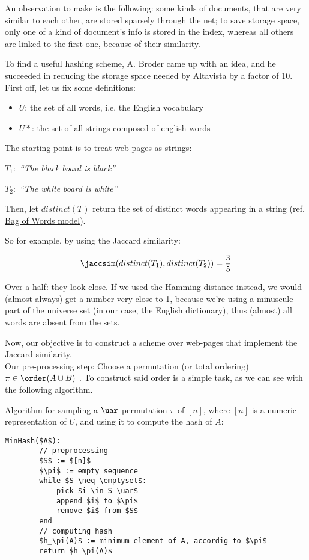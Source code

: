 	An observation to make is the following: some kinds of documents, that are very similar to each other, are stored sparsely through the net; to save storage space, only one of a kind of document's info is stored in the index, whereas all others are linked to the first one, because of their similarity.
	
	To find a useful hashing scheme, A. Broder came up with an idea, and he succeeded in reducing the storage space needed by Altavista by a factor of 10.\\
	First off, let us fix some definitions:
	\begin{itemize}
	\item $U$: the set of all words, i.e. the English vocabulary
	\item $U*$: the set of all strings composed of english words
	\end{itemize}
	
	The starting point is to treat web pages as strings:
	
	$T_1:$ \textit{``The black board is black''}
	
	$T_2:$ \textit{``The white board is white''}
	
	Then, let $distinct(T)$ return the set of distinct words appearing in a string (ref. \href{https://en.wikipedia.org/wiki/Bag-of-words_model}{Bag of Words model}).
	
	So for example, by using the Jaccard similarity:
    
    \begin{equation}
    \jaccsim(distinct(T_1), distinct(T_2))= \frac{3}{5}
    \end{equation}
	
	Over a half: they look close. If we used the Hamming distance instead, we would (almost always) get a number very close to 1, because we're using a minuscule part of the universe set (in our case, the English dictionary), thus (almost) all words are absent from the sets.
	
	Now, our objective is to construct a scheme over web-pages that implement the Jaccard similarity.\\
	Our pre-processing step: Choose a permutation (or total ordering) $\pi \in \order(A \cup B)$ \uar. To construct said order is a simple task, as we can see with the following algorithm.
	
	\newpage
	Algorithm for sampling a $\uar$ permutation $\pi$ of $[n]$, where $[n]$ is a numeric representation of $U$, and using it to compute the hash of $A$:
	\begin{lstlisting}[caption={min hash or shingles algorithm},label={lst:min_hash}]
	MinHash($A$):
	    // preprocessing
	    $S$ := $[n]$
	    $\pi$ := empty sequence
	    while $S \neq \emptyset$:
	        pick $i \in S \uar$
	        append $i$ to $\pi$
	        remove $i$ from $S$
	    end
	    // computing hash
	    $h_\pi(A)$ := minimum element of A, accordig to $\pi$
	    return $h_\pi(A)$
	\end{lstlisting}
	
